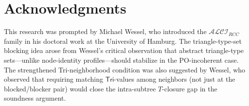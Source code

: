 \documentclass[a4paper,11pt]{article}
\theoremstyle{definition}
\newcommand{\ALCI}{\ensuremath{\mathcal{ALCI}}}
\newcommand{\Tri}{\ensuremath{\mathsf{Tri}}}
\begin{document}
\section*{Acknowledgments}

This research was prompted by Michael Wessel, who introduced the
$\ALCI_{\mathit{RCC}}$ family in his doctoral work at the University
of Hamburg.  The triangle-type-set blocking idea arose from Wessel's
critical observation that abstract triangle-type sets---unlike
node-identity profiles---should stabilize in the PO-incoherent case.
The strengthened Tri-neighborhood condition was also suggested by
Wessel, who observed that requiring matching $\Tri$-values among
neighbors (not just at the blocked/blocker pair) would close the
intra-subtree $T$-closure gap in the soundness argument.
\end{document}
